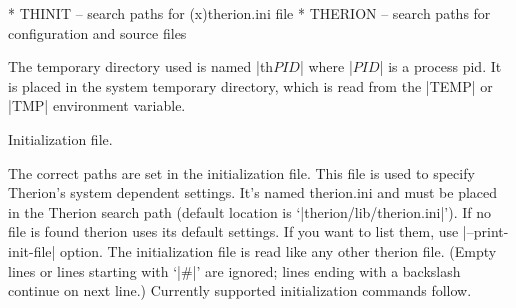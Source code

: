 \list
* THINIT -- search paths for (x)therion.ini file
* THERION -- search paths for configuration and source files


%


%   
\endlist








The temporary directory used is named |th$PID$| where |$PID$| is a 
process pid. It is placed in the system temporary directory, which is
read from the |TEMP| or |TMP| environment variable. 

\subsubchapter Initialization file.

The correct paths are set in the initialization file.
This file is used to specify Therion's system dependent settings. 
It's named therion.ini and must be placed in the Therion 
search path (default location is `|therion/lib/therion.ini|'). If no
file is found therion uses its default settings. If you want to list
them, use |--print-init-file| option. The initialization file is read 
like any other therion file. (Empty lines or lines starting with `|#|' are 
ignored; lines ending with a backslash continue on next line.) Currently 
supported initialization commands follow.

